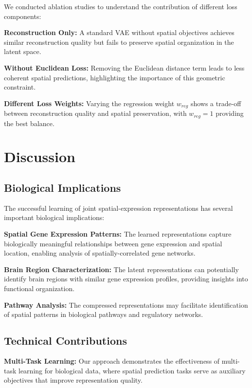 \documentclass[11pt]{article}
\begin{document}
We conducted ablation studies to understand the contribution of different loss components:

\textbf{Reconstruction Only:} A standard VAE without spatial objectives achieves similar reconstruction quality but fails to preserve spatial organization in the latent space.

\textbf{Without Euclidean Loss:} Removing the Euclidean distance term leads to less coherent spatial predictions, highlighting the importance of this geometric constraint.

\textbf{Different Loss Weights:} Varying the regression weight $w_{reg}$ shows a trade-off between reconstruction quality and spatial preservation, with $w_{reg} = 1$ providing the best balance.

\section{Discussion}
\label{sec:discussion}

\subsection{Biological Implications}

The successful learning of joint spatial-expression representations has several important biological implications:

\textbf{Spatial Gene Expression Patterns:} The learned representations capture biologically meaningful relationships between gene expression and spatial location, enabling analysis of spatially-correlated gene networks.

\textbf{Brain Region Characterization:} The latent representations can potentially identify brain regions with similar gene expression profiles, providing insights into functional organization.

\textbf{Pathway Analysis:} The compressed representations may facilitate identification of spatial patterns in biological pathways and regulatory networks.

\subsection{Technical Contributions}

\textbf{Multi-Task Learning:} Our approach demonstrates the effectiveness of multi-task learning for biological data, where spatial prediction tasks serve as auxiliary objectives that improve representation quality.
\end{document}
